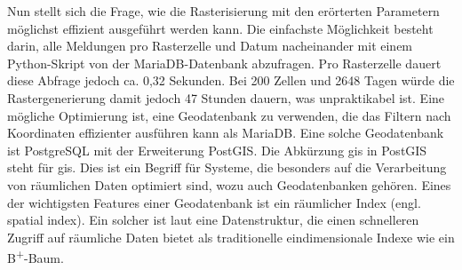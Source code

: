 Nun stellt sich die Frage, wie die Rasterisierung mit den erörterten Parametern möglichst effizient ausgeführt werden kann.
Die einfachste Möglichkeit besteht darin, alle Meldungen pro Rasterzelle und Datum nacheinander mit einem Python-Skript von der MariaDB-Datenbank abzufragen.
Pro Rasterzelle dauert diese Abfrage jedoch ca. 0,32 Sekunden.
Bei 200 Zellen und 2648 Tagen würde die Rastergenerierung damit jedoch 47 Stunden dauern, was unpraktikabel ist.
Eine mögliche Optimierung ist, eine Geodatenbank zu verwenden, die das Filtern nach Koordinaten effizienter ausführen kann als MariaDB.
Eine solche Geodatenbank ist PostgreSQL mit der Erweiterung PostGIS.
Die Abkürzung \acrshort{gis} in PostGIS steht für \acrlong{gis}.
Dies ist ein Begriff für Systeme, die besonders auf die Verarbeitung von räumlichen Daten optimiert sind, wozu auch Geodatenbanken gehören.
Eines der wichtigsten Features einer Geodatenbank ist ein räumlicher Index (engl. spatial index).
Ein solcher ist laut \cite[S. 2707 f.]{SpatialIndexingTechniques} eine Datenstruktur, die einen schnelleren Zugriff auf räumliche Daten bietet als traditionelle eindimensionale Indexe wie ein B\textsuperscript{+}-Baum.


